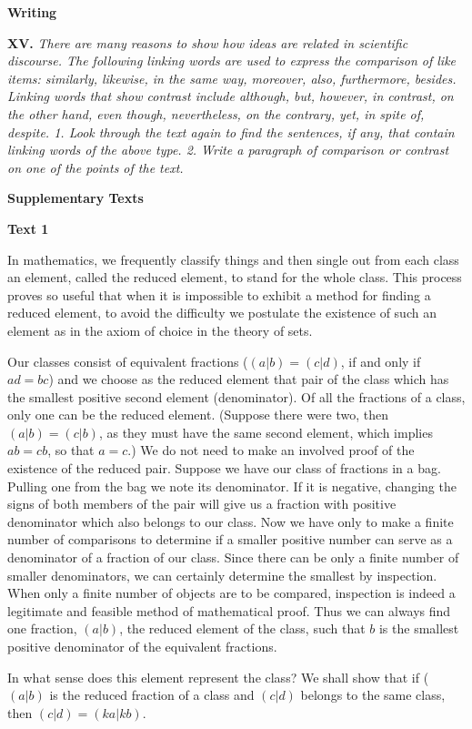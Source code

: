 \documentclass[a4paper]{article}
\newcommand{\ESect}[1]{\medskip\par{\large \textbf{#1}}\par}
\newcommand{\ETask}[2]{\medskip\par\textbf{#1.} \textit{#2}\par}
\begin{document}
\ESect{Writing}
\ETask{XV}{There are many reasons to show how ideas are related in scientific discourse. The following linking words are used
to express the comparison of like items: similarly, likewise, in the same way, moreover, also, furthermore, besides. Linking
words that show contrast include although, but, however, in contrast, on the other hand, even though, nevertheless, on the
contrary, yet, in spite of, despite. 1. Look through the text again to find the sentences, if any, that contain linking words
of the above type. 2. Write a paragraph of comparison or contrast on one of the points of the text.}

\ESect{Supplementary Texts}

\ESect{Text 1}

In mathematics, we frequently classify things and then single out from each class an element, called the reduced element, to
stand for the whole class. This process proves so useful that when it is impossible to exhibit a method for finding a reduced
element, to avoid the difficulty we postulate the existence of such an element as in the axiom of choice in the theory of sets.

Our classes consist of equivalent fractions ($(a|b)=(c|d)$, if and only if $ad = bc$) and we choose as the reduced element
that pair of the class which has the smallest positive second element (denominator). Of all the fractions of a class, only
one can be the reduced element. (Suppose there were two, then $(a|b)=(c|b)$, as they must have the same second element, which
implies $ab=cb$, so that $a=c$.) We do not need to make an involved proof of the existence of the reduced pair. Suppose we have
our class of fractions in a bag. Pulling one from the bag we note its denominator. If it is negative, changing the signs of
both members of the pair will give us a fraction with positive denominator which also belongs to our class. Now we have only
to make a finite number of comparisons to determine if a smaller positive number can serve as a denominator of a fraction of
our class. Since there can be only a finite number of smaller denominators, we can certainly determine the smallest by inspection.
When only a finite number of objects are to be compared, inspection is indeed a legitimate and feasible method of mathematical
proof. Thus we can always find one fraction, $(a|b)$, the reduced element of the class, such that $b$ is the smallest positive
denominator of the equivalent fractions.

In what sense does this element represent the class? We shall show that if ($(a|b)$ is the reduced fraction of a class and
$(c|d)$ belongs to the same class, then $(c|d) = (ka|kb)$.
\end{document}
